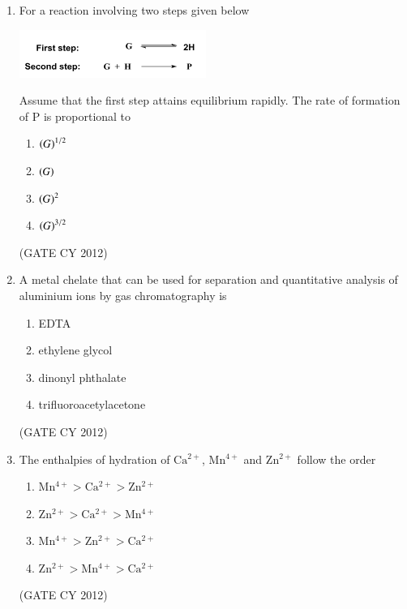 \documentclass[12pt]{article}
\begin{document}
\begin{enumerate}
\item For a reaction involving two steps given below

\includegraphics[width=0.4\columnwidth]{figs/q15.png}

Assume that the first step attains equilibrium rapidly. The rate of formation of P is proportional to
\begin{multicols}{2}
\begin{enumerate}
    \item $\left(G\right)^{1/2}$
    \item $\left(G\right)$
    \item $\left(G\right)^{2}$
    \item $\left(G\right)^{3/2}$
\end{enumerate}
\end{multicols}
\hfill (GATE CY 2012)

\item A metal chelate that can be used for separation and quantitative analysis of aluminium ions by gas chromatography is
\begin{multicols}{2}
\begin{enumerate}
    \item EDTA
    \item ethylene glycol
    \item dinonyl phthalate
    \item trifluoroacetylacetone
\end{enumerate}
\end{multicols}
\hfill (GATE CY 2012)

\item The enthalpies of hydration of $\mathrm{Ca^{2+}}$, $\mathrm{Mn^{4+}}$ and $\mathrm{Zn^{2+}}$ follow the order
\begin{multicols}{2}
\begin{enumerate}[label=(\alph*)]
    \item $\mathrm{Mn^{4+} > Ca^{2+} > Zn^{2+}}$
    \item $\mathrm{Zn^{2+} > Ca^{2+} > Mn^{4+}}$
    \item $\mathrm{Mn^{4+} > Zn^{2+} > Ca^{2+}}$
    \item $\mathrm{Zn^{2+} > Mn^{4+} > Ca^{2+}}$
\end{enumerate}
\end{multicols}
\hfill (GATE CY 2012)



\end{enumerate}
\end{document}
